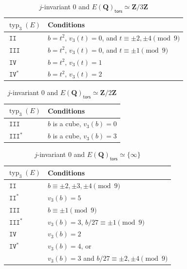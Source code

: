 \documentclass{amsart}
\newcommand{\Z}{\mathbf{Z}}
\newcommand{\Q}{\mathbf{Q}}
\newcommand{\tors}{\mathsf{tors}}
\DeclareMathOperator{\typ}{{typ}}
\DeclareMathOperator{\II}{\mathtt{II}}
\DeclareMathOperator{\III}{\mathtt{III}}
\DeclareMathOperator{\IV}{\mathtt{IV}}
\numberwithin{equation}{section}
\theoremstyle{plain}
\theoremstyle{remark}
\begin{document}
\begin{center}
 \begin{table}[h]
 \begin{tabular}{|l|l|} 
 \hline
$\typ_3(E)$ & Conditions \\
 \hline
$\II$ & $b=t^2$,  $v_3(t)=0$, and $t\equiv \pm 2, \pm 4 \pmod{9}$ \\
$\III$ & $b=t^2$, $v_3(t)=0$, and $t\equiv \pm 1 \pmod{9}$  \\
$\IV$ & $b=t^2$, $v_3(t)=1$ \\
$\IV^*$ & $b=t^2$, $v_3(t)=2$  \\
 \hline
\end{tabular}
 \caption{$j$-invariant 0 and $E(\Q)_\tors \simeq \Z/3\Z$}
 \label{j0_Z3_torsion}
 \end{table}
 \end{center}

\begin{center}
 \begin{table}[h]
 \begin{tabular}{|l|l|}
 \hline
$\typ_3(E)$ & Conditions \\
 \hline
 $\III$ & $b$ is a cube, $v_3(b)=0$ \\
 $\III^*$ & $b$ is a cube, $v_3(b) =3$\\
 \hline
\end{tabular}
 \caption{$j$-invariant 0 and $E(\Q)_\tors \simeq \Z/2\Z$}  \label{j0_Z2_torsion}
 \end{table}
 \end{center}
 
\begin{center}
\begin{table}[h]
 \begin{tabular}{|l|l|}
 \hline
$\typ_3(E)$ & Conditions \\
 \hline
 $\II$ & $b \equiv \pm 2, \pm 3,\pm 4 \pmod{9}$\\
 $\II^*$ &$v_3(b) = 5$\\
 $\III$ & $b\equiv \pm 1\pmod{9}$ \\
 $\III^*$ & $v_3(b) = 3$, $b/27 \equiv \pm 1 \pmod{9}$ \\
 $\IV$ & $v_3(b)=2$\\
 $\IV^*$ & $v_3(b)=4$, or\\
 &$v_3(b)=3$ and $b/27 \equiv \pm 2,\pm4 \pmod{9}$ \\
 \hline
\end{tabular}
 \caption{$j$-invariant 0 and $E(\Q)_\tors \simeq \lbrace \infty \rbrace$} \label{j0_trivial_torsion}
 \end{table} 
 \end{center}
\end{document}
